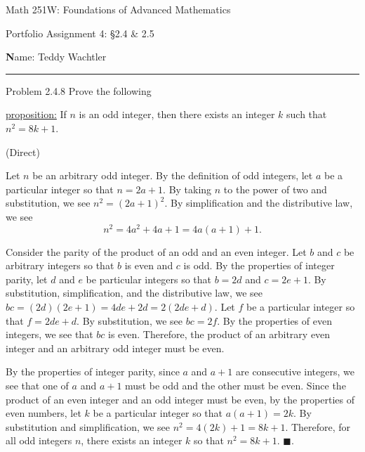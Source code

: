 \documentclass{article}
\theoremstyle{definition}
\renewcommand{\qed}{\blacksquare}
\begin{document}
	\begin{center}
		\Large{Math 251W: Foundations of Advanced Mathematics}

		\normalsize{Portfolio Assignment 4: \S 2.4 \& 2.5}

		\vspace{0.2cm}

		\hfill {\textbf Name:} Teddy Wachtler

		\vspace{0.25cm}
		\hrule
	\end{center}

	\vspace{0.3cm}


	\noindent Problem 2.4.8
	Prove the following
	\vspace{0.3cm}

	\underline{proposition:}
	If $n$ is an odd integer, then there exists an integer $k$ such that $n^2=8k+1$.

	\vspace{0.4cm}
	 (Direct)
	\vspace{0.2cm}

	Let $n$ be an arbitrary odd integer.
	By the definition of odd integers, let $a$ be a particular integer so that $n = 2a + 1$.
	By taking $n$ to the power of two and substitution, we see $n^2 = (2a + 1)^2$.
	By simplification and the distributive law, we see \[n^2 = 4a^2 + 4a + 1 = 4a(a + 1) + 1.\]

	Consider the parity of the product of an odd and an even integer.
	Let $b$ and $c$ be arbitrary integers so that $b$ is even and $c$ is odd.
	By the properties of integer parity, let $d$ and $e$ be particular integers so that $b = 2d$ and $c = 2e + 1$.
	By substitution, simplification, and the distributive law, we see $bc = (2d)(2e + 1) = 4de + 2d = 2(2de + d)$.
	Let $f$ be a particular integer so that $f = 2de + d$.
	By substitution, we see $bc = 2f$.
	By the properties of even integers, we see that $bc$ is even.
	Therefore, the product of an arbitrary even integer and an arbitrary odd integer must be even.
	
	By the properties of integer parity, since $a$ and $a + 1$ are consecutive integers, we see that one of $a$ and $a + 1$ must be odd and the other must be even.
	Since the product of an even integer and an odd integer must be even, by the properties of even numbers, let $k$ be a particular integer so that $a(a + 1) = 2k$.
	By substitution and simplification, we see $n^2 = 4(2k) + 1 = 8k + 1$.
	Therefore, for all odd integers $n$, there exists an integer $k$ so that $n^2 = 8k + 1$.
	$\qed$.

	\vspace{1cm}
\end{document}
